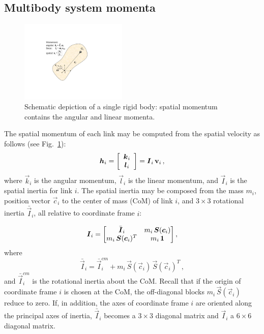 \documentclass{llncs}
\newcommand{\bh}{\mbox{\boldmath $h$}}
\newcommand{\vc}{\vec{c}}
\newcommand{\vI}{\vec{I}}
\newcommand{\vIb}{\bar{\vI}}
\newcommand{\vk}{\vec{k}}
\newcommand{\BM}{\begin{bmatrix}}
\newcommand{\EM}{\end{bmatrix}}
\newcommand{\bone}{{\bf 1}}
\newcommand{\vIbar}{\bar{\vI}}
\newcommand{\vl}{\vec{l}}
\newcommand{\vS}{\vec{S}}
\newcommand{\bv}{{\bf v}}
\begin{document}
\subsection{Multibody system momenta}

\begin{figure}[t]
\begin{center}
\includegraphics[width=2.0in]{Figures/fig1.pdf}
\end{center}
\caption{Schematic depiction of a single rigid body:
spatial momentum contains the angular and linear momenta.} \label{fig1}
\end{figure}


The spatial momentum of each link may be computed from the spatial velocity as follows
(see Fig.~\ref{fig1}):
%
\begin{equation}
\bh_i = \left[ \begin{array}{c} \vk_i \\ \vl_i \end{array} \right] = \vI_i \, \bv_i \, ,
\end{equation}
%
where $\vk_i$ is the angular momentum, $\vl_i$ is the linear
momentum, and $\vI_i$ is the spatial inertia for link $i$. The
spatial inertia may be composed from the mass $m_i$, position vector $\vc_i$
to the center of mass (CoM)  of link $i$, and $3 \times 3$ rotational
inertia $\vIb_i$, all relative to coordinate frame $i$:

\begin{equation}
\label{eq:spatialinertia}
\vI_i =
\BM
  \vIbar_i & m_i \, \vS(\vc_i) \\ m_i \, \vS(\vc_i)^T & m_i \, \bone
\EM ,
\end{equation}
%
where
%
\begin{equation}
\vIbar_i = \vIbar^{cm}_i \!\! + m_i \, \vS(\vc_i) \, \vS(\vc_i)^T \, ,
\end{equation}
%
and $\vIbar^{cm}_i$ is the rotational inertia about the CoM.
Recall that if the origin of coordinate frame $i$ is chosen
at the CoM, the off-diagonal blocks $m_i \, \vS(\vc_i)$
reduce to zero. If, in addition, the axes of coordinate frame $i$
are oriented along the principal axes of inertia, $\vIbar_i$ becomes a
$3\times 3$ diagonal matrix and $\vI_i$ a $6\times 6$ diagonal matrix.
\end{document}

